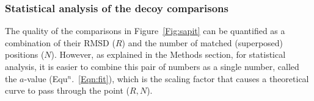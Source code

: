 \documentclass[12pt]{article}
\newcommand{\Eqn}[1]{Equ$^n$.~\ref{Eqn:#1}}
\newcommand{\Fig}[1]{Figure~\ref{Fig:#1}}
\newcommand{\3}{$3_{10}$}
\begin{document}
%
%
%
%
%
%
%
%
%


\subsubsection{Statistical analysis of the decoy comparisons}

The quality of the comparisons in \Fig{sapit} can be quantified as a combination of their
RMSD ($R$) and the number of matched (superposed) positions ($N$).   However, as explained in 
the Methods section, for statistical analysis, it is easier to combine this pair of numbers
as a single number,  called the $a$-value (\Eqn{fit}), which is the scaling factor that
causes a theoretical curve to pass through the point ($R,N$).
\end{document}
